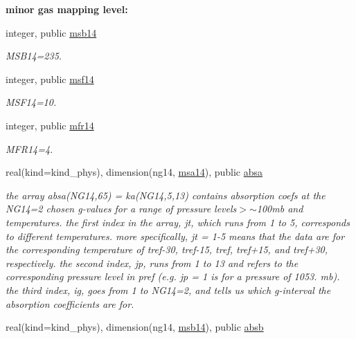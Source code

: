 \begin{Indent}\textbf{ minor gas mapping level\+:}\par
\begin{DoxyCompactItemize}
\item 
integer, public \hyperlink{group__module__radlw__kgbnn_ga2d400a2aa969f2b2b6efd15555b67159}{msb14}
\begin{DoxyCompactList}\small\item\em M\+S\+B14=235. \end{DoxyCompactList}\item 
integer, public \hyperlink{group__module__radlw__kgbnn_ga37c15d52e45cd6b36dc246a059b0c5ca}{msf14}
\begin{DoxyCompactList}\small\item\em M\+S\+F14=10. \end{DoxyCompactList}\item 
integer, public \hyperlink{group__module__radlw__kgbnn_ga52354badbce95c005b19bd5a443fd488}{mfr14}
\begin{DoxyCompactList}\small\item\em M\+F\+R14=4. \end{DoxyCompactList}\item 
real(kind=kind\+\_\+phys), dimension(ng14, \hyperlink{namespacemodule__radlw__kgb14_a9357fbaa5663438f0c0062a45c99a8d4}{msa14}), public \hyperlink{group__module__radlw__kgbnn_gab57cb029ede27280bc99641f39ab3a81}{absa}
\begin{DoxyCompactList}\small\item\em the array absa(\+N\+G14,65) = ka(\+N\+G14,5,13) contains absorption coefs at the N\+G14=2 chosen g-\/values for a range of pressure levels$>$$\sim$100mb and temperatures. the first index in the array, jt, which runs from 1 to 5, corresponds to different temperatures. more specifically, jt = 1-\/5 means that the data are for the corresponding temperature of tref-\/30, tref-\/15, tref, tref+15, and tref+30, respectively. the second index, jp, runs from 1 to 13 and refers to the corresponding pressure level in pref (e.\+g. jp = 1 is for a pressure of 1053. mb). the third index, ig, goes from 1 to N\+G14=2, and tells us which g-\/interval the absorption coefficients are for. \end{DoxyCompactList}\item 
real(kind=kind\+\_\+phys), dimension(ng14, \hyperlink{group__module__radlw__kgbnn_ga2d400a2aa969f2b2b6efd15555b67159}{msb14}), public \hyperlink{group__module__radlw__kgbnn_gaa7a122319c49f3c1e8d51d21771cb63d}{absb}

\end{DoxyCompactItemize}
\end{Indent}
